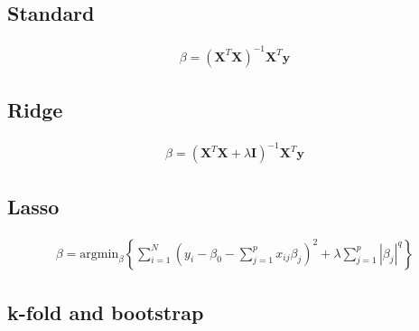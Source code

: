 \subsection{Standard}


\begin{align*}
    \beta = \left(
    \textbf{X}^T\textbf{X}
    \right)^{-1}
    \textbf{X}^T\textbf{y}
\end{align*}

\subsection{Ridge}

\begin{align*}
    \beta = \left(
    \textbf{X}^T\textbf{X}
     + \lambda \textbf{I}
     \right)^{-1}
    \textbf{X}^T\textbf{y}
\end{align*}

\subsection{Lasso}

\begin{align*}
    \beta = \text{argmin}_{\beta}
    \left\{
    \sum^N_{i=1}
    \left(
    y_i - \beta_0 -
    \sum_{j=1}^p x_{ij}\beta_j
    \right)^2
    + \lambda
    \sum^p_{j=1}|\beta_j|^q
    \right\}
\end{align*}


\subsection{k-fold and bootstrap}

